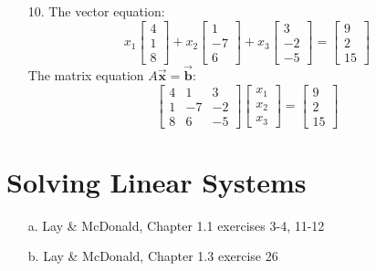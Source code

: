 \documentclass[12pt]{article}
\newcommand{\vect}[1]{\Vec{\textbf{#1}}}
\theoremstyle{definition}
\begin{document}
{\begin{enumerate}
    \item[10.] 
    The vector equation:
    \[
    x_1 \begin{bmatrix} 4 \\ 1 \\ 8 \end{bmatrix} + x_2 \begin{bmatrix} 1 \\ -7 \\ 6 \end{bmatrix} + x_3 \begin{bmatrix} 3 \\ -2 \\ -5 \end{bmatrix} = \begin{bmatrix} 9 \\ 2 \\ 15 \end{bmatrix}
    \]
    The matrix equation $A \vect{x} = \vect{b}$:
    \[
    \begin{bmatrix} 
    4 & 1 & 3 \\
    1 & -7 & -2 \\
    8 & 6 & -5
    \end{bmatrix}
    \begin{bmatrix} 
    x_1 \\ x_2 \\ x_3
    \end{bmatrix} = 
    \begin{bmatrix} 
    9 \\ 2 \\ 15
    \end{bmatrix}
    \]
\end{enumerate}

}

\newpage
\section{Solving Linear Systems}

\begin{enumerate}
    \item[a.] Lay \& McDonald, Chapter 1.1 exercises 3-4, 11-12
    \item[b.] Lay \& McDonald, Chapter 1.3 exercise 26
\end{enumerate}
\end{document}
